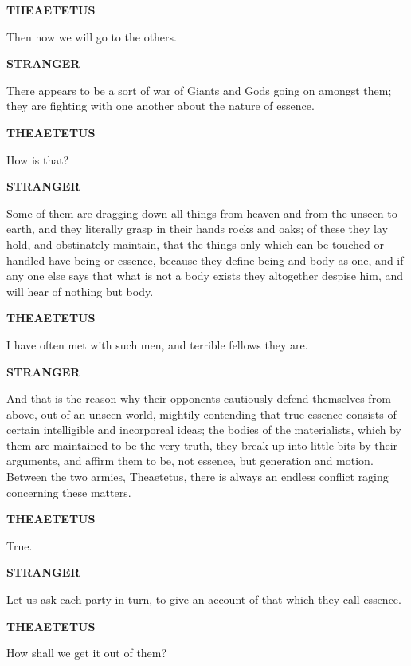 \documentclass[11pt,letter]{article}
\begin{document}
\par \textbf{THEAETETUS}
\par   Then now we will go to the others.

\par \textbf{STRANGER}
\par   There appears to be a sort of war of Giants and Gods going on amongst them; they are fighting with one another about the nature of essence.

\par \textbf{THEAETETUS}
\par   How is that?

\par \textbf{STRANGER}
\par   Some of them are dragging down all things from heaven and from the unseen to earth, and they literally grasp in their hands rocks and oaks; of these they lay hold, and obstinately maintain, that the things only which can be touched or handled have being or essence, because they define being and body as one, and if any one else says that what is not a body exists they altogether despise him, and will hear of nothing but body.

\par \textbf{THEAETETUS}
\par   I have often met with such men, and terrible fellows they are.

\par \textbf{STRANGER}
\par   And that is the reason why their opponents cautiously defend themselves from above, out of an unseen world, mightily contending that true essence consists of certain intelligible and incorporeal ideas; the bodies of the materialists, which by them are maintained to be the very truth, they break up into little bits by their arguments, and affirm them to be, not essence, but generation and motion. Between the two armies, Theaetetus, there is always an endless conflict raging concerning these matters.

\par \textbf{THEAETETUS}
\par   True.

\par \textbf{STRANGER}
\par   Let us ask each party in turn, to give an account of that which they call essence.

\par \textbf{THEAETETUS}
\par   How shall we get it out of them?
\end{document}
